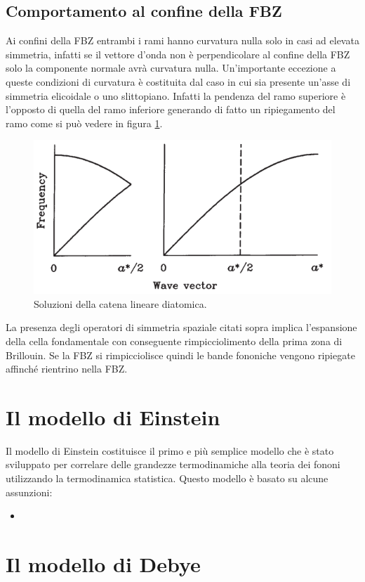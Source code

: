 \documentclass[oneside]{amsbook}
\numberwithin{section}{chapter}
\numberwithin{equation}{section}
\numberwithin{figure}{section}
\begin{document}
\subsection{Comportamento al confine della FBZ}
Ai confini della FBZ entrambi i rami hanno curvatura nulla solo in casi ad elevata simmetria, infatti se il vettore d'onda non è perpendicolare al confine della FBZ solo la componente normale avrà curvatura nulla.
Un'importante eccezione a queste condizioni di curvatura è costituita dal caso in cui sia presente un'asse di simmetria elicoidale o uno slittopiano. Infatti la pendenza del ramo superiore è l'opposto di quella del ramo inferiore generando di fatto un ripiegamento del ramo come si può vedere in figura \ref{AA3}.

\begin{figure}[H]
\centering
\caption{Soluzioni della catena lineare diatomica.}\label{AA3}
\includegraphics[scale=0.5]{AA3}
\end{figure}

La presenza degli operatori di simmetria spaziale citati sopra implica l'espansione della cella fondamentale con conseguente rimpicciolimento della prima zona di Brillouin. Se la FBZ si rimpicciolisce quindi le bande fononiche vengono ripiegate affinché rientrino nella FBZ.
\section{Il modello di Einstein}
Il modello di Einstein costituisce il primo e più semplice modello che è stato sviluppato per correlare delle grandezze termodinamiche alla teoria dei fononi utilizzando la termodinamica statistica. Questo modello è basato su alcune assunzioni:
\begin{itemize}
\item
\end{itemize}
\section{Il modello di Debye}
\newpage
\printindex
\end{document}
